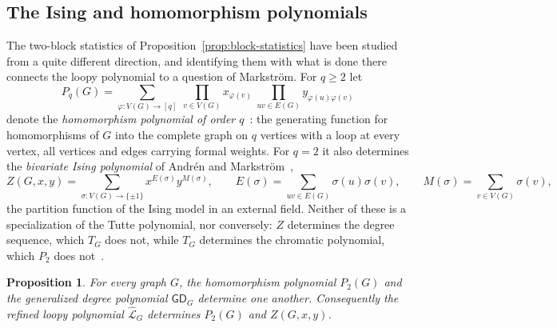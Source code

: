 \documentclass[11pt]{article}
\theoremstyle{plain}
\newtheorem{proposition}[theorem]{Proposition}
\theoremstyle{definition}
\renewcommand{\mathcal}{\mathscr}
\newcommand{\LL}{\mathcal{L}}    %
\newcommand{\GD}{\mathsf{GD}}    %
\numberwithin{equation}{section}
\begin{document}
\subsection{The Ising and homomorphism polynomials}
\label{subsec:ising}

The two-block statistics of Proposition~\ref{prop:block-statistics} have
been studied from a quite different direction, and identifying them with what is done there
connects the loopy polynomial to a question of Markstr\"om.
%
For $q\ge 2$ let
\begin{equation}\label{eq:hom-poly}
 P_q(G)  = \sum_{\varphi:V(G)\to[q]} \ \prod_{v\in V(G)}x_{\varphi(v)} \ \prod_{uv\in E(G)}y_{\varphi(u)\varphi(v)}
\end{equation}
denote the \emph{homomorphism polynomial of order $q$}~\cite{Mar}: the
generating function for homomorphisms of $G$ into the complete graph on $q$
vertices with a loop at every vertex, all vertices and edges carrying formal weights.
For $q=2$ it also determines the \emph{bivariate Ising polynomial} of Andr\'en and Markstr\"om~\cite{AM},
\begin{equation}
  \label{eq:ising}
  Z(G,x,y) = \sum_{\sigma:V(G)\to\{\pm1\}}x^{E(\sigma)}y^{M(\sigma)},
   \qquad
   E(\sigma)=\sum_{uv\in E(G)}\sigma(u)\sigma(v),
   \qquad
   M(\sigma)=\sum_{v\in V(G)}\sigma(v),
 \end{equation}
the partition function of the Ising model in an external field.
Neither of these is a specialization of the Tutte polynomial,
nor conversely: $Z$ determines the degree sequence, which $T_G$ does not,
while $T_G$ determines the chromatic polynomial, which $P_2$ does not~\cite{AM,Mar}.

\begin{proposition}\label{prop:ising}
 For every graph $G$, the homomorphism polynomial $P_2(G)$ and the generalized degree polynomial $\GD_G$
 determine one another. Consequently the refined loopy polynomial   $\widehat{\LL}_G$
 determines $P_2(G)$ and $Z(G,x,y)$.
\end{proposition}
\end{document}
